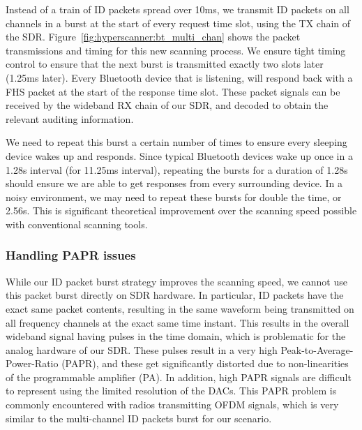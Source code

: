 Instead of a train of ID packets spread over 10ms, we transmit ID packets on all channels in a burst at the start of every request time slot, using the TX chain of the SDR.
%
Figure~\ref{fig:hyperscanner:bt_multi_chan} shows the packet transmissions and timing for this new scanning process.
%
We ensure tight timing control to ensure that the next burst is transmitted exactly two slots later (1.25ms later). 
%
Every Bluetooth device that is listening, will respond back with a FHS packet at the start of the response time slot. 
%
These packet signals can be received by the wideband RX chain of our SDR, and decoded to obtain the relevant auditing information.
%

We need to repeat this burst a certain number of times to ensure every sleeping device wakes up and responds.
%
Since typical Bluetooth devices wake up once in a 1.28s interval (for 11.25ms interval), repeating the bursts for a duration of 1.28s should ensure we are able to get responses from every surrounding device.
%
In a noisy environment, we may need to repeat these bursts for double the time, or 2.56s. 
%
This is significant theoretical improvement over the scanning speed possible with conventional scanning tools.

\subsubsection*{Handling PAPR issues}
While our ID packet burst strategy improves the scanning speed, we cannot use this packet burst directly on SDR hardware.
%
In particular, ID packets have the exact same packet contents, resulting in the same waveform being transmitted on all frequency channels at the exact same time instant.
%
This results in the overall wideband signal having pulses in the time domain, which is problematic for the analog hardware of our SDR.
%
These pulses result in a very high Peak-to-Average-Power-Ratio (PAPR), and these get significantly distorted due to non-linearities of the programmable amplifier (PA).
%
In addition, high PAPR signals are difficult to represent using the limited resolution of the DACs.
%
This PAPR problem is commonly encountered with radios transmitting OFDM signals, which is very similar to the multi-channel ID packets burst for our scenario.

